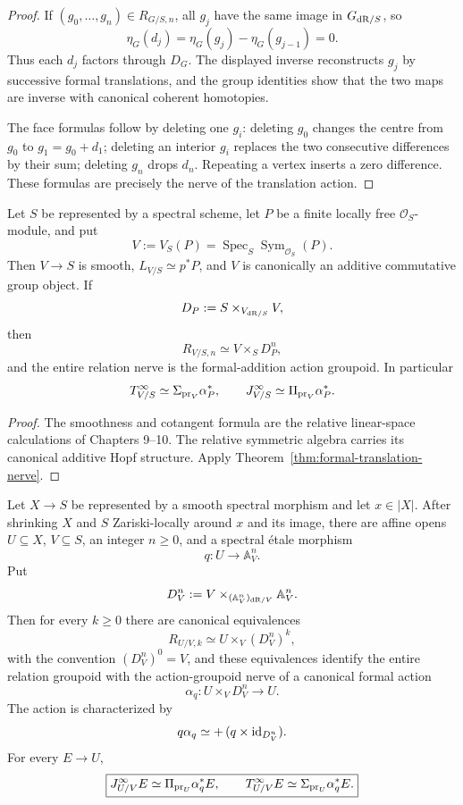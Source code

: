 \begin{proof}
If $(g_0,\ldots,g_n)\in R_{G/S,n}$, all $g_j$ have the same image in $G_{\mathrm{dR}/S}$, so
\[
    \eta_G(d_j)=\eta_G(g_j)-\eta_G(g_{j-1})=0.
\]
Thus each $d_j$ factors through $D_G$.  The displayed inverse reconstructs $g_j$ by successive formal translations, and the group identities show that the two maps are inverse with canonical coherent homotopies.

The face formulas follow by deleting one $g_i$: deleting $g_0$ changes the centre from $g_0$ to $g_1=g_0+d_1$; deleting an interior $g_i$ replaces the two consecutive differences by their sum; deleting $g_n$ drops $d_n$.  Repeating a vertex inserts a zero difference.  These formulas are precisely the nerve of the translation action.
\end{proof}

\begin{corollary}
\label{cor:jet-relative-linear-space}
Let $S$ be represented by a spectral scheme, let $P$ be a finite locally free $\mathcal O_S$-module, and put
\[
    V:=V_S(P)=\operatorname{Spec}_S\operatorname{Sym}_{\mathcal O_S}(P).
\]
Then $V\to S$ is smooth, $L_{V/S}\simeq p^*P$, and $V$ is canonically an additive commutative group object.  If
\[
    D_P:=S\times_{V_{\mathrm{dR}/S}}V,
\]
then
\[
    R_{V/S,n}\simeq V\times_SD_P^n,
\]
and the entire relation nerve is the formal-addition action groupoid.  In particular
\[
    T^{\infty}_{V/S}\simeq\Sigma_{\operatorname{pr}_V}\alpha_P^*,
    \qquad
    J^{\infty}_{V/S}\simeq\Pi_{\operatorname{pr}_V}\alpha_P^*.
\]
\end{corollary}

\begin{proof}
The smoothness and cotangent formula are the relative linear-space calculations of Chapters 9--10.  The relative symmetric algebra carries its canonical additive Hopf structure.  Apply Theorem~\ref{thm:formal-translation-nerve}.
\end{proof}

\begin{theorem}
\label{thm:jet-local-linearization}
Let $X\to S$ be represented by a smooth spectral morphism and let $x\in|X|$.  After shrinking $X$ and $S$ Zariski-locally around $x$ and its image, there are affine opens $U\subseteq X$, $V\subseteq S$, an integer $n\geq0$, and a spectral \'{e}tale morphism
\[
    q:U\longrightarrow\mathbb A^n_V.
\]
Put
\[
    D^n_V
    :=
    V\times_{(\mathbb A^n_V)_{\mathrm{dR}/V}}\mathbb A^n_V.
\]
Then for every $k\geq0$ there are canonical equivalences
\[
\boxed{
    R_{U/V,k}
    \simeq
    U\times_V(D^n_V)^k,
}
\]
with the convention $(D^n_V)^0=V$, and these equivalences identify the entire relation groupoid with the action-groupoid nerve of a canonical formal action
\[
    \alpha_q:U\times_VD^n_V\longrightarrow U.
\]
The action is characterized by
\[
    q\alpha_q
    \simeq
    +\,(q\times\operatorname{id}_{D^n_V}).
\]
For every $E\to U$,
\[
\boxed{
    J^{\infty}_{U/V}E
    \simeq
    \Pi_{\operatorname{pr}_U}\alpha_q^*E,
    \qquad
    T^{\infty}_{U/V}E
    \simeq
    \Sigma_{\operatorname{pr}_U}\alpha_q^*E.
}
\]
\end{theorem}

